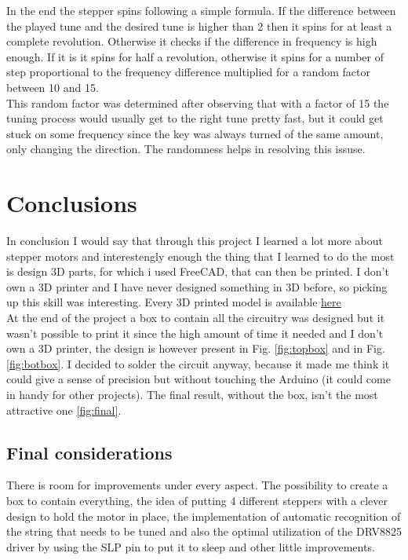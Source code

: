 \documentclass[a4paper,12pt]{article}
\begin{document}
\begin{multicols}{2}
In the end the stepper spins following a simple formula. If the difference between the played tune and the desired tune is higher than 2 then it spins for at least a complete revolution. Otherwise it checks if the difference in frequency is high enough. If it is it spins for half a revolution, otherwise it spins for a number of step proportional to the frequency difference multiplied for a random factor between 10 and 15.\\
This random factor was determined after observing that with a factor of 15 the tuning process would usually get to the right tune pretty fast, but it could get stuck on some frequency since the key was always turned of the same amount, only changing the direction. The randomness helps in resolving this issuse.
\section{Conclusions}
In conclusion I would say that through this project I learned a lot more about stepper motors and interestengly enough the thing that I learned to do the most is design 3D parts, for which i used FreeCAD, that can then be printed. I don't own a 3D printer and I have never designed something in 3D before, so picking up this skill was interesting. Every 3D printed model is available \href{https://github.com/Prop4et/LoM_Uketuner/tree/master/3D}{here}\\
At the end of the project a box to contain all the circuitry was designed but it wasn't possible to print it since the high amount of time it needed and I don't own a 3D printer, the design is however present in Fig. \ref{fig:topbox} and in Fig. \ref{fig:botbox}. I decided to solder the circuit anyway, because it made me think it could give a sense of precision but without touching the Arduino (it could come in handy for other projects). The final result, without the box, isn't the most attractive one \ref{fig:final}.
\subsection{Final considerations}
There is room for improvements under every aspect. The possibility to create a box to contain everything, the idea of putting 4 different steppers with a clever design to hold the motor in place, the implementation of automatic recognition of the string that needs to be tuned and also the optimal utilization of the DRV8825 driver by using the SLP pin to put it to sleep and other little improvements.
\end{multicols}
\newpage
\end{document}
